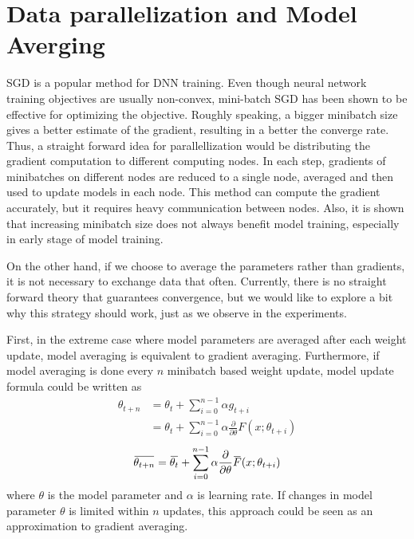 \documentclass{article}
\newcommand{\overbar}[1]{\mkern 1.5mu\overline{\mkern-1.5mu#1\mkern-1.5mu}\mkern 1.5mu}
\begin{document}
\section{Data parallelization and Model Averging}
SGD is a popular method for DNN training. Even though neural network training objectives are usually non-convex, 
mini-batch SGD has been shown to be effective for optimizing the objective\cite{seide2011conversational}. 
Roughly speaking, a bigger minibatch size gives a better estimate of the gradient, resulting in a better the converge rate. 
Thus, a straight forward idea for parallellization would be distributing the gradient computation to different computing
nodes. In each step, gradients of minibatches on different nodes are reduced to a single node, averaged and then used to 
update models in each node. This method can compute the gradient accurately, but it requires heavy communication between nodes.
Also, it is shown that increasing minibatch size does not always benefit model training\cite{seide2011conversational}, 
especially in early stage of model training.

On the other hand, if we choose to average the parameters rather than gradients, it is not necessary to exchange data that often. 
Currently, there is no straight forward theory that guarantees convergence, but we would like to explore a bit why this strategy 
should work, just as we observe in the experiments.

First, in the extreme case where model parameters are averaged after each weight update, model averaging is equivalent to 
gradient averaging. Furthermore, if model averaging is done every $n$ minibatch based weight update, model update formula could
be written as
\begin{equation}
\begin{split}
\theta_{t+n} &= \theta_{t} +\sum_{i=0}^{n-1} \alpha g_{t+i}\\
&= \theta_{t} +\sum_{i=0}^{n-1} \alpha \frac{\partial}{\partial\theta} F(x;\theta_{t+i})
\end{split}
\end{equation}
\begin{equation}
\overbar{\theta_{t+n}} = \overbar{\theta_{t}} +\sum_{i=0}^{n-1} \alpha \frac{\partial}{\partial\theta} \overbar{F}(x;\theta_{t+i})
\end{equation}
where $\theta$ is the model parameter and $\alpha$ is learning rate. If changes in model parameter $\theta$ is limited 
within $n$ updates, this approach could be seen as an approximation to gradient averaging.
\end{document}
